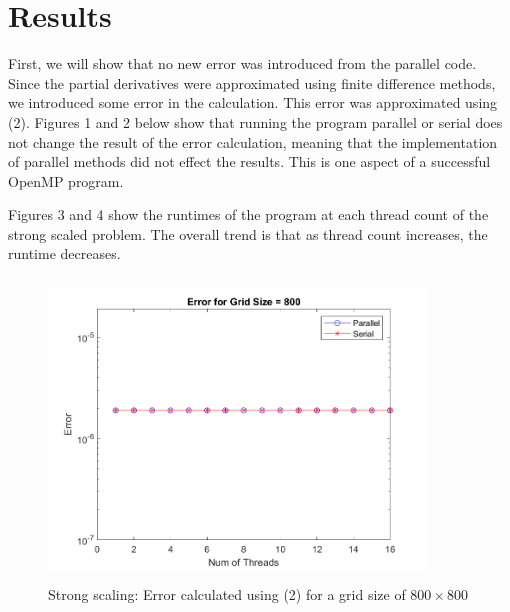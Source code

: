 \documentclass[12pt]{article}
\begin{document}
	\section{Results}
	First, we will show that no new error was introduced from the parallel code. Since the partial derivatives were approximated using finite difference methods, we introduced some error in the calculation. This error was approximated using (2). 
 Figures 1 and 2 below show that running the program parallel or serial does not change the result of the error calculation, meaning that the implementation of parallel methods did not effect the results. This is one aspect of a successful OpenMP program.
	



	Figures 3 and 4 show the runtimes of the program at each thread count of the strong scaled problem. The overall trend is that as thread count increases, the runtime decreases. 

		\begin{figure}[H]
		\centering
		\includegraphics[width=100mm,height=80mm]{errorVthread800.png}
		\caption{Strong scaling: Error calculated using (2) for a grid size of $800\times800$}
	\end{figure}
	
\end{document}
